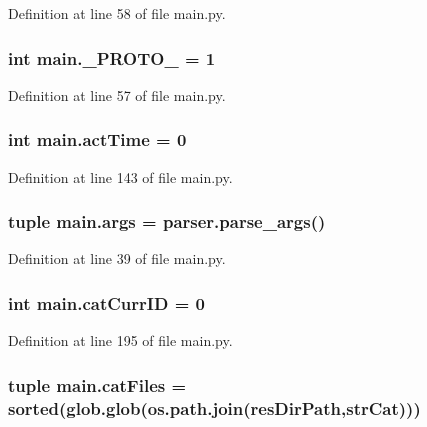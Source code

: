 Definition at line 58 of file main.\+py.

\hypertarget{a00153_afe92b072adc360963093d3660e7684ce}{
\subsubsection[{\+\_\+\+P\+R\+O\+T\+O\+\_\+}]{\setlength{\rightskip}{0pt plus 5cm}int main.\+\_\+\+P\+R\+O\+T\+O\+\_\+ = 1}}\label{a00153_afe92b072adc360963093d3660e7684ce}


Definition at line 57 of file main.\+py.

\hypertarget{a00153_a9c2013c88f8354ccf6504c51843f1d5e}{
\subsubsection[{act\+Time}]{\setlength{\rightskip}{0pt plus 5cm}int main.\+act\+Time = 0}}\label{a00153_a9c2013c88f8354ccf6504c51843f1d5e}


Definition at line 143 of file main.\+py.

\hypertarget{a00153_a80760a53c8941c6f6f30e633649ffd8d}{
\subsubsection[{args}]{\setlength{\rightskip}{0pt plus 5cm}tuple main.\+args = parser.\+parse\+\_\+args()}}\label{a00153_a80760a53c8941c6f6f30e633649ffd8d}


Definition at line 39 of file main.\+py.

\hypertarget{a00153_aa56c55225fa65fa569bd8d5f1063550e}{
\subsubsection[{cat\+Curr\+I\+D}]{\setlength{\rightskip}{0pt plus 5cm}int main.\+cat\+Curr\+I\+D = 0}}\label{a00153_aa56c55225fa65fa569bd8d5f1063550e}


Definition at line 195 of file main.\+py.

\hypertarget{a00153_a189dc9cf606d870dacab059d5e7dca24}{
\subsubsection[{cat\+Files}]{\setlength{\rightskip}{0pt plus 5cm}tuple main.\+cat\+Files = sorted(glob.\+glob(os.\+path.\+join({\bf res\+Dir\+Path},{\bf str\+Cat})))}}\label{a00153_a189dc9cf606d870dacab059d5e7dca24}


